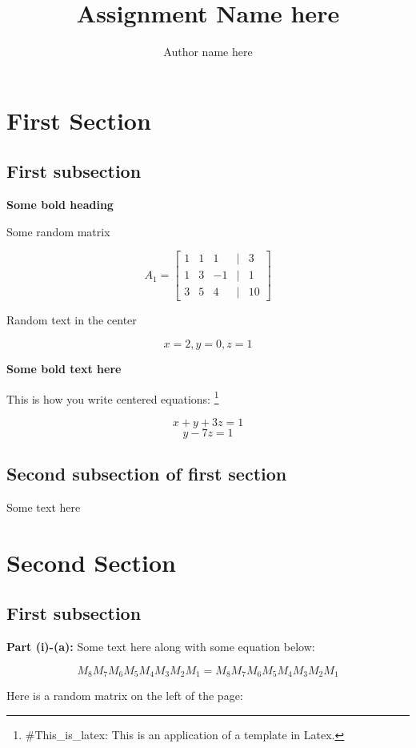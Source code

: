 \documentclass[12pt]{article}
\title{Assignment Name here}
\author{Author name here}
\begin{document}
\maketitle

\section{First Section}

\subsection{First subsection}
\textbf{Some bold heading} 

Some random matrix

\[
A_{1} = 
\begin{bmatrix}
1 & 1  & 1 &  | & 3   \\ 
1 & 3  & -1 & | & 1  \\ 
3 & 5 & 4 & | & 10
\end{bmatrix}
\]

\begin{center}
Random text in the center
\end{center}

\[ x = 2, y = 0, z = 1\]


\textbf{Some bold text here} 

This is how you write centered equations: \footnote{ \#This\_is\_latex: This is an application of a template in Latex.}

\[x+y+3z=1\]
\[y-7z=1\]

\subsection{Second subsection of first section}

Some text here

\section{Second Section}

\subsection{First subsection}
\textbf{Part (i)-(a):} Some text here along with some equation below:

\[ M_8 M_7 M_6 M_5 M_4 M_3 M_2 M_1 = M_8 M_7 M_6 M_5 M_4 M_3 M_2 M_1 \]

Here is a random matrix on the left of the page:\\
\end{document}
